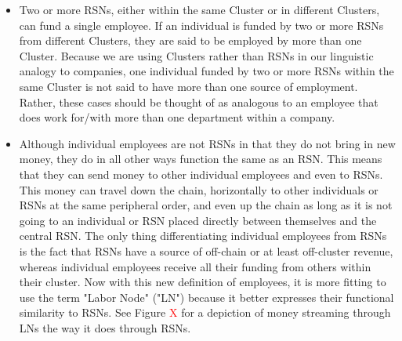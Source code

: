 \documentclass{article}[10pt]
\begin{document}
\begin{itemize}
    \item Two or more RSNs, either within the same Cluster or in different Clusters, can fund a single employee.
    If an individual is funded by two or more RSNs from different Clusters, they are said to be employed by more than one Cluster.
    Because we are using Clusters rather than RSNs in our linguistic analogy to companies, one individual funded by two or more RSNs within the same Cluster is not said to have more than one source of employment.
    Rather, these cases should be thought of as analogous to an employee that does work for/with more than one department within a company.

    \item Although individual employees are not RSNs in that they do not bring in new money, they do in all other ways function the same as an RSN.
    This means that they can send money to other individual employees and even to RSNs.
    This money can travel down the chain, horizontally to other individuals or RSNs at the same peripheral order, and even up the chain as long as it is not going to an individual or RSN placed directly between themselves and the central RSN.
    The only thing differentiating individual employees from RSNs is the fact that RSNs have a source of off-chain or at least off-cluster revenue, whereas individual employees receive all their funding from others within their cluster.
    Now with this new definition of employees, it is more fitting to use the term "Labor Node" ("LN") because it better expresses their functional similarity to RSNs. See Figure \textcolor{red}{X} for a depiction of money streaming through LNs the way it does through RSNs.
\end{itemize}
\end{document}

